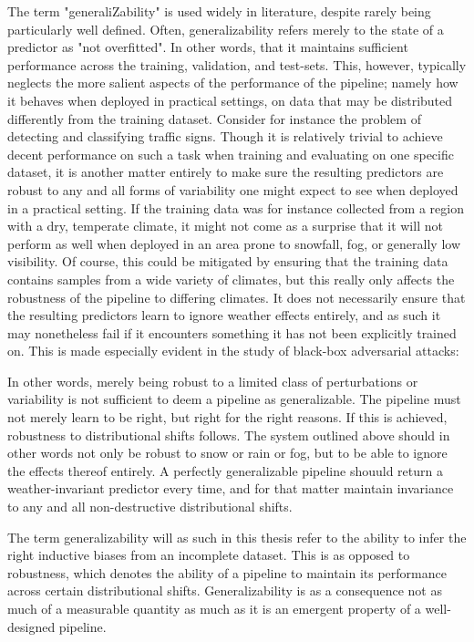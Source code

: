 	The term "generaliZability" is used widely in literature, despite rarely being particularly well defined. Often, generalizability refers merely to the state of a predictor as "not overfitted". In other words, that it maintains sufficient performance across the training, validation, and test-sets. This, however, typically neglects the more salient aspects of the performance of the pipeline; namely how it behaves when deployed in practical settings, on data that may be distributed differently from the training dataset. Consider for instance the problem of detecting and classifying traffic signs. Though it is relatively trivial to achieve decent performance on such a task when training and evaluating on one specific dataset, it is another matter entirely to make sure the resulting predictors are robust to any and all forms of variability one might expect to see when deployed in a practical setting. If the training data was for instance collected from a region with a dry, temperate climate, it might not come as a surprise that it will not perform as well when deployed in an area prone to snowfall, fog, or generally low visibility. Of course, this could be mitigated by ensuring that the training data contains samples from a wide variety of climates, but this really only affects the robustness of the pipeline to differing climates. It does not necessarily ensure that the resulting predictors learn to ignore weather effects entirely, and as such it may nonetheless fail if it encounters something it has not been explicitly trained on. This is made especially evident in the study of black-box adversarial attacks: %
	        
	In other words, merely being robust to a limited class of perturbations or variability is not sufficient to deem a pipeline as generalizable. The pipeline must not merely learn to be right, but right for the right reasons. If this is achieved, robustness to distributional shifts follows. The system outlined above should in other words not only be robust to snow or rain or fog, but to be able to ignore the effects thereof entirely. A perfectly generalizable pipeline shouuld return a weather-invariant predictor every time, and for that matter maintain invariance to any and all non-destructive distributional shifts. 
	        
	The term generalizability will as such in this thesis refer to the ability to infer the right inductive biases from an incomplete dataset. This is as opposed to robustness, which denotes the ability of a pipeline to maintain its performance across certain distributional shifts. Generalizability is as a consequence not as much of a measurable quantity as much as it is an emergent property of a well-designed pipeline. 
	        
